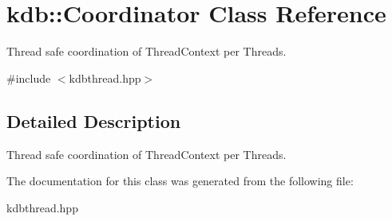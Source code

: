 \hypertarget{classkdb_1_1Coordinator}{\section{kdb\+:\+:Coordinator Class Reference}
\label{classkdb_1_1Coordinator}
}


Thread safe coordination of Thread\+Context per Threads.  




{\ttfamily \#include $<$kdbthread.\+hpp$>$}



\subsection{Detailed Description}
Thread safe coordination of Thread\+Context per Threads. 

The documentation for this class was generated from the following file\+:\begin{DoxyCompactItemize}
\item 
kdbthread.\+hpp\end{DoxyCompactItemize}
